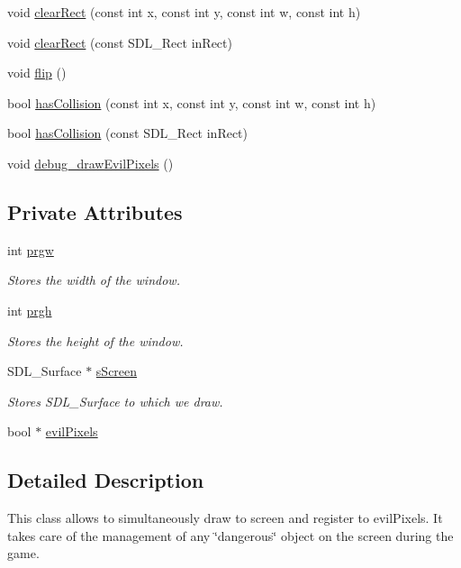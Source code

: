 \begin{DoxyCompactItemize}
\item 
void \hyperlink{classGameScreen_acd5bcd1c48cbece054e2ab81ee13f115}{clear\+Rect} (const int x, const int y, const int w, const int h)
\item 
void \hyperlink{classGameScreen_a3b0e4a997c1a70eedaad70f5528aa76d}{clear\+Rect} (const S\+D\+L\+\_\+\+Rect in\+Rect)
\item 
void \hyperlink{classGameScreen_ac557bae4483c1a081025b93283ab2cc0}{flip} ()
\item 
bool \hyperlink{classGameScreen_a237598c9fc8ed55da47eee6b2a79163d}{has\+Collision} (const int x, const int y, const int w, const int h)
\item 
bool \hyperlink{classGameScreen_ad7abbecce93b436fe8b0da842b84f700}{has\+Collision} (const S\+D\+L\+\_\+\+Rect in\+Rect)
\item 
void \hyperlink{classGameScreen_ac65d8850623fadc20cbd86b6a53b812b}{debug\+\_\+draw\+Evil\+Pixels} ()
\end{DoxyCompactItemize}
\subsection*{Private Attributes}
\begin{DoxyCompactItemize}
\item 
int \hyperlink{classGameScreen_a6aff345a535677a3d955a5a40cfe3fd9}{prgw}
\begin{DoxyCompactList}\small\item\em Stores the width of the window. \end{DoxyCompactList}\item 
int \hyperlink{classGameScreen_a9eec4473f165faa5b0464f3fd93bd49d}{prgh}
\begin{DoxyCompactList}\small\item\em Stores the height of the window. \end{DoxyCompactList}\item 
S\+D\+L\+\_\+\+Surface $\ast$ \hyperlink{classGameScreen_a3cccda4980b40a1ab70bee3b244f7741}{s\+Screen}
\begin{DoxyCompactList}\small\item\em Stores S\+D\+L\+\_\+\+Surface to which we draw. \end{DoxyCompactList}\item 
bool $\ast$ \hyperlink{classGameScreen_aef21e4a0c39f3e68962fe84357c54cfa}{evil\+Pixels}
\end{DoxyCompactItemize}


\subsection{Detailed Description}
This class allows to simultaneously draw to screen and register to evil\+Pixels. It takes care of the management of any \char`\"{}dangerous\char`\"{} object on the screen during the game.


